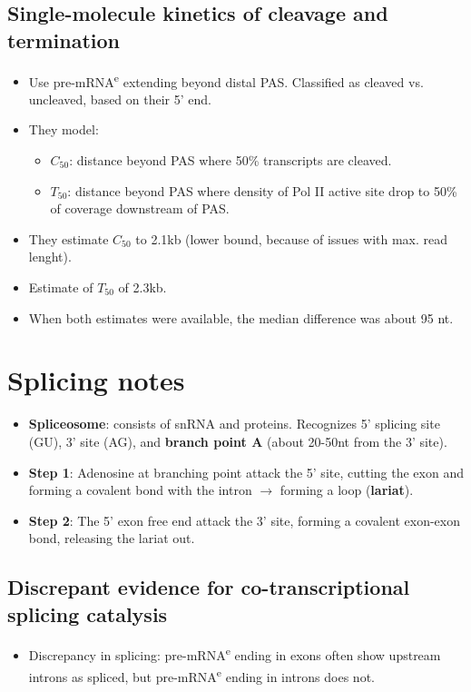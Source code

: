 \documentclass{article}
\begin{document}
	\subsection{Single-molecule kinetics of cleavage and termination}
	\begin{itemize}
		\item Use pre-mRNA\textsuperscript{e} extending beyond distal PAS. Classified as cleaved vs. uncleaved, based on their 5' end.
		\item They model:
		\begin{itemize}
			\item $C_{50}$: distance beyond PAS where 50\% transcripts are cleaved.
			\item $T_{50}$: distance beyond PAS where density of Pol II active site drop to 50\% of coverage downstream of PAS.			
		\end{itemize}
		\item They estimate $C_{50}$ to 2.1kb (lower bound, because of issues with max. read lenght).
		\item Estimate of $T_{50}$ of 2.3kb. 
		\item When both estimates were available, the median difference was about 95 nt.
	\end{itemize}
	
	\section*{Splicing notes}
	\begin{itemize}
		\item \textbf{Spliceosome}: consists of snRNA and proteins. Recognizes 5' splicing site (GU), 3' site (AG), and \textbf{branch point A} (about 20-50nt from the 3' site).
		\item \textbf{Step 1}: Adenosine at branching point attack the 5' site, cutting the exon and forming a covalent bond with the intron $\to$ forming a loop (\textbf{lariat}).
		\item \textbf{Step 2}: The 5' exon free end attack the 3' site, forming a covalent exon-exon bond, releasing the lariat out.
	\end{itemize}
	
	\subsection{Discrepant evidence for co-transcriptional splicing catalysis}
	\begin{itemize}
		\item Discrepancy in splicing: pre-mRNA\textsuperscript{e} ending in exons often show upstream introns as spliced, but pre-mRNA\textsuperscript{e} ending in introns does not.
		
	\end{itemize}
\end{document}
